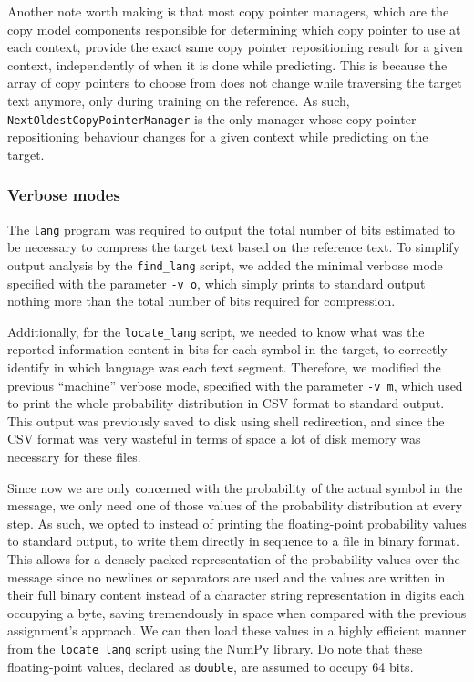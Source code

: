 \documentclass{article}
\begin{document}
Another note worth making is that most copy pointer managers, which are the copy model components responsible for determining which copy pointer to use at each context, provide the exact same copy pointer repositioning result for a given context, independently of when it is done while predicting.
This is because the array of copy pointers to choose from does not change while traversing the target text anymore, only during training on the reference.
As such, \texttt{NextOldestCopyPointerManager} is the only manager whose copy pointer repositioning behaviour changes for a given context while predicting on the target.

\subsubsection{Verbose modes}
\label{subsubsec:methodology_lang_model_verbose}

The \texttt{lang} program was required to output the total number of bits estimated to be necessary to compress the target text based on the reference text.
To simplify output analysis by the \texttt{find\_lang} script, we added the minimal verbose mode specified with the parameter \texttt{-v o}, which simply prints to standard output nothing more than the total number of bits required for compression.

Additionally, for the \texttt{locate\_lang} script, we needed to know what was the reported information content in bits for each symbol in the target, to correctly identify in which language was each text segment.
Therefore, we modified the previous ``machine'' verbose mode, specified with the parameter \texttt{-v m}, which used to print the whole probability distribution in CSV format to standard output.
This output was previously saved to disk using shell redirection, and since the CSV format was very wasteful in terms of space a lot of disk memory was necessary for these files.

Since now we are only concerned with the probability of the actual symbol in the message, we only need one of those values of the probability distribution at every step.
As such, we opted to instead of printing the floating-point probability values to standard output, to write them directly in sequence to a file in binary format.
This allows for a densely-packed representation of the probability values over the message since no newlines or separators are used and the values are written in their full binary content instead of a character string representation in digits each occupying a byte, saving tremendously in space when compared with the previous assignment's approach.
We can then load these values in a highly efficient manner from the \texttt{locate\_lang} script using the NumPy library.
Do note that these floating-point values, declared as \texttt{double}, are assumed to occupy 64 bits.
\end{document}
